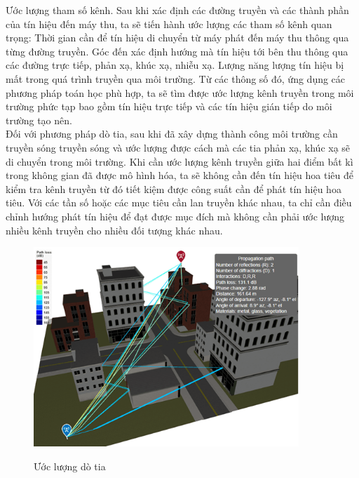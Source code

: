 \documentclass{article}
\begin{document}
Ước lượng tham số kênh. Sau khi xác định các đường truyền và các thành phần của tín hiệu đến máy thu, ta sẽ tiến hành ước lượng các tham số kênh quan trọng: Thời gian cần để tín hiệu di chuyển từ máy phát đến máy thu thông qua từng đường truyền. Góc đến xác định hướng mà tín hiệu tới bên thu thông qua các đường trực tiếp, phản xạ, khúc xạ, nhiễu xạ. Lượng năng lượng tín hiệu bị mất trong quá trình truyền qua môi trường. Từ các thông số đó, ứng dụng các phương pháp toán học phù hợp, ta sẽ tìm được ước lượng kênh truyền trong môi trường phức tạp bao gồm tín hiệu trực tiếp và các tín hiệu gián tiếp do môi trường tạo nên.\\
\newpage
Đối với phương pháp dò tia, sau khi đã xây dựng thành công môi trường cần truyền sóng truyền sóng và ước lượng được cách mà các tia phản xạ, khúc xạ sẽ di chuyển trong môi trường. Khi cần ước lượng kênh truyền giữa hai điểm bất kì trong không gian đã được mô hình hóa, ta sẽ không cần đến tín hiệu hoa tiêu để kiểm tra kênh truyền từ đó tiết kiệm được công suất cần để phát tín hiệu hoa tiêu. Với các tần số hoặc các mục tiêu cần lan truyền khác nhau, ta chỉ cần điều chỉnh hướng phát tín hiệu để đạt được mục đích mà không cần phải ước lượng nhiều kênh truyền cho nhiều đối tượng khác nhau. 

\begin{figure}[h!]
    \centering
  \includegraphics[width = 10cm]{photo/2.4.7.png}\\
    \caption{Ước lượng dò tia}
    \label{Hình 11}
\end{figure}
\end{document}
